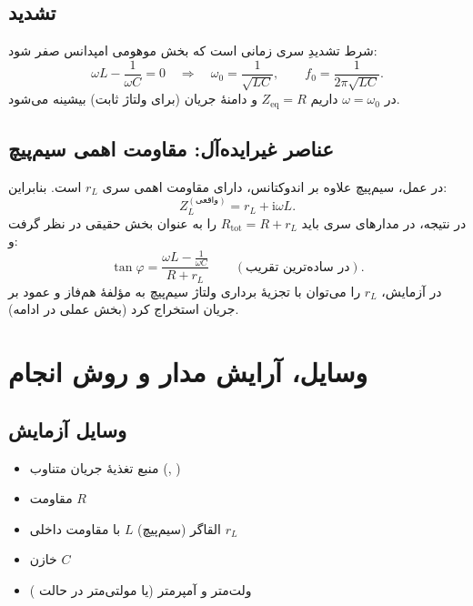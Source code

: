\documentclass[a4paper,11pt]{article}
\newcommand{\ii}{\mathrm{i}} %
\begin{document}
\subsection{تشدید }
شرط تشدیدِ سری زمانی است که بخش موهومی امپدانس صفر شود:
\[
\omega L-\frac{1}{\omega C}=0
\quad\Rightarrow\quad
\omega_0=\frac{1}{\sqrt{LC}},\qquad
f_0=\frac{1}{2\pi\sqrt{LC}}.
\]
در $\omega=\omega_0$ داریم $Z_{\text{eq}}=R$ و دامنهٔ جریان (برای ولتاژ ثابت) بیشینه می‌شود.

\subsection{عناصر غیرایده‌آل: مقاومت اهمی سیم‌پیچ}
در عمل، سیم‌پیچ علاوه بر اندوکتانس، دارای مقاومت اهمی سری $r_L$ است. بنابراین:
\[
Z_L^{(\text{واقعی})}=r_L+\ii\omega L.
\]
در نتیجه، در مدارهای سری باید $R_{\text{tot}}=R+r_L$ را به عنوان بخش حقیقی در نظر گرفت و:
\[
\tan\varphi = \frac{\omega L-\frac{1}{\omega C}}{R+r_L}\qquad(\text{در ساده‌ترین تقریب}).
\]
در آزمایش، $r_L$ را می‌توان با تجزیهٔ برداری ولتاژ سیم‌پیچ به مؤلفهٔ هم‌فاز و عمود بر جریان استخراج کرد (بخش عملی در ادامه).

\section{وسایل، آرایش مدار و روش انجام}
\subsection{وسایل آزمایش}
\begin{itemize}
\item منبع تغذیهٔ جریان متناوب (, )
\item مقاومت $R$
\item القاگر (سیم‌پیچ) $L$ با مقاومت داخلی $r_L$
\item خازن $C$
\item ولت‌متر  و آمپرمتر  (یا مولتی‌متر در حالت )
\end{itemize}
\end{document}
